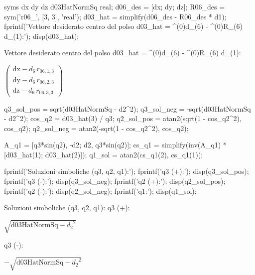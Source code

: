 \documentclass[11pt, a4paper]{article}
\begin{document}
\begin{matlabcode}
syms dx dy dz d03HatNormSq real;
d06_des = [dx; dy; dz];
R06_des = sym('r06_', [3, 3], 'real');
d03_hat = simplify(d06_des - R06_des * d1);
fprintf('Vettore desiderato centro del polso d03_hat = ^(0)d_(6) - ^(0)R_(6) d_(1):\n');
disp(d03_hat);
\end{matlabcode}
\begin{matlaboutput}
Vettore desiderato centro del polso d03_hat = ^(0)d_(6) - ^(0)R_(6) d_(1):
\end{matlaboutput}
\begin{matlabsymbolicoutput}
$\displaystyle \left(\begin{array}{c}
\textrm{dx}-d_6 \,r_{06,1,3} \\
\textrm{dy}-d_6 \,r_{06,2,3} \\
\textrm{dz}-d_6 \,r_{06,3,3}
\end{array}\right)$
\end{matlabsymbolicoutput}
\begin{matlabcode}
q3_sol_pos = sqrt(d03HatNormSq - d2^2);
q3_sol_neg = -sqrt(d03HatNormSq - d2^2);
cos_q2 = d03_hat(3) / q3;
q2_sol_pos = atan2(sqrt(1 - cos_q2^2), cos_q2);
q2_sol_neg = atan2(-sqrt(1 - cos_q2^2), cos_q2);

A_q1 = [q3*sin(q2), -d2; d2, q3*sin(q2)];
cs_q1 = simplify(inv(A_q1) * [d03_hat(1); d03_hat(2)]);
q1_sol = atan2(cs_q1(2), cs_q1(1));
\end{matlabcode}
\newpage
\begin{matlabcode}
fprintf('Soluzioni simboliche (q3, q2, q1):\n');
fprintf('q3 (+):\n'); disp(q3_sol_pos);
fprintf('q3 (-):\n'); disp(q3_sol_neg);
fprintf('q2 (+):\n'); disp(q2_sol_pos);
fprintf('q2 (-):\n'); disp(q2_sol_neg);
fprintf('q1:\n'); disp(q1_sol);
\end{matlabcode}
\begin{matlaboutput}
Soluzioni simboliche (q3, q2, q1):
q3 (+):
\end{matlaboutput}
\begin{matlabsymbolicoutput}
$\displaystyle \sqrt{\textrm{d03HatNormSq}-{d_2}^2}$
\end{matlabsymbolicoutput}
\begin{matlaboutput}
q3 (-):
\end{matlaboutput}
\begin{matlabsymbolicoutput}
$\displaystyle -\sqrt{\textrm{d03HatNormSq}-{d_2}^2}$
\end{matlabsymbolicoutput}
\end{document}
